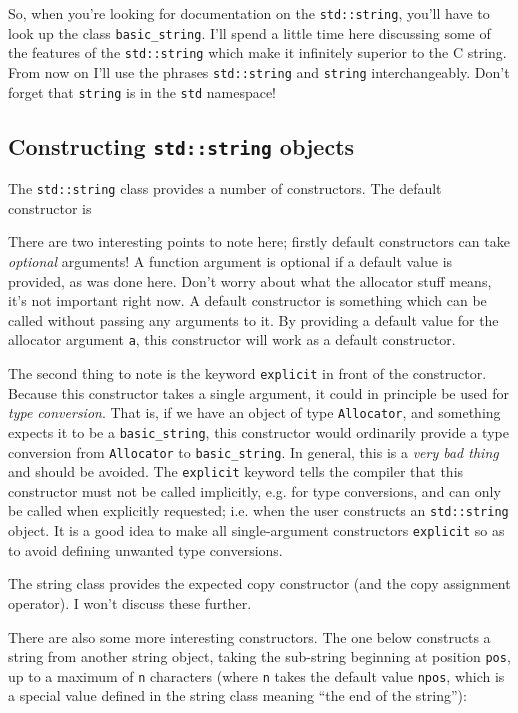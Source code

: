 \documentclass[a4paper]{scrartcl}
\begin{document}
So, when you're looking for documentation on the \texttt{std::string}, you'll have to look up the class \texttt{basic\_string}. I'll spend a little time here discussing some of the features of the \texttt{std::string} which make it infinitely superior to the C string. From now on I'll use the phrases \texttt{std::string} and \texttt{string} interchangeably. Don't forget that \texttt{string} is in the \texttt{std} namespace!

\subsection{Constructing \texttt{std::string} objects}
The \texttt{std::string} class provides a number of constructors. The default constructor is


There are two interesting points to note here; firstly default constructors can take \emph{optional} arguments! A function argument is optional if a default value is provided, as was done here. Don't worry about what the allocator stuff means, it's not important right now. A default constructor is something which can be called without passing any arguments to it. By providing a default value for the allocator argument \texttt{a}, this constructor will work as a default constructor.

The second thing to note is the keyword \texttt{explicit} in front of the constructor. Because this constructor takes a single argument, it could in principle be used for \emph{type conversion}. That is, if we have an object of type \texttt{Allocator}, and something expects it to be a \texttt{basic\_string}, this constructor would ordinarily provide a type conversion from \texttt{Allocator} to \texttt{basic\_string}. In general, this is a \emph{very bad thing} and should be avoided. The \texttt{explicit} keyword tells the compiler that this constructor must not be called implicitly, e.g. for type conversions, and can only be called when explicitly requested; i.e. when the user constructs an \texttt{std::string} object. It is a good idea to make all single-argument constructors \texttt{explicit} so as to avoid defining unwanted type conversions.

The string class provides the expected copy constructor (and the copy assignment operator). I won't discuss these further.

There are also some more interesting constructors. The one below constructs a string from another string object, taking the sub-string beginning at position \texttt{pos}, up to a maximum of \texttt{n} characters (where \texttt{n} takes the default value \texttt{npos}, which is a special value defined in the string class meaning ``the end of the string''):

\end{document}
